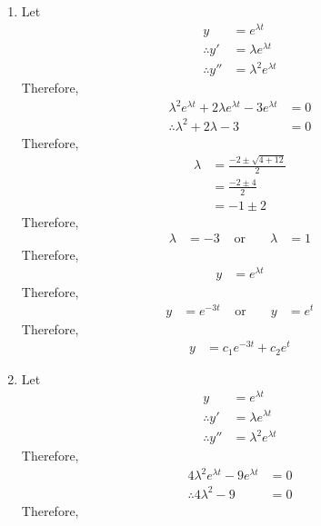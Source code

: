 \documentclass[fleqn, a4paper, 11pt, oneside]{amsart}
\theoremstyle{definition}
\theoremstyle{theorem}
\begin{document}
\begin{solution}
	\begin{enumerate}[leftmargin = *]
		\item
			Let
			\begin{align*}
				y              & = e^{\lambda t}         \\
				\therefore y'  & = \lambda e^{\lambda t} \\
				\therefore y'' & = \lambda^2 e^{\lambda t}
			\end{align*}
			Therefore,
			\begin{align*}
				\lambda^2 e^{\lambda t} + 2 \lambda e^{\lambda t} - 3 e^{\lambda t} & = 0 \\
				\therefore \lambda^2 + 2 \lambda - 3                                & = 0
			\end{align*}
			Therefore,
			\begin{align*}
				\lambda & = \frac{-2 \pm \sqrt{4 + 12}}{2} \\
                                        & = \frac{-2 \pm 4}{2}             \\
                                        & = -1 \pm 2
			\end{align*}
			Therefore,
			\begin{align*}
				\lambda & = -3 & \text{ or } &  & \lambda & = 1
			\end{align*}
			Therefore,
			\begin{align*}
				y & = e^{\lambda t}
			\end{align*}
			Therefore,
			\begin{align*}
				y & = e^{-3 t} & \text{ or } &  & y & = e^{t}
			\end{align*}
			Therefore,
			\begin{align*}
				y &= c_1 e^{-3 t} + c_2 e^{t}
			\end{align*}
		\item
			Let
			\begin{align*}
				y              & = e^{\lambda t}         \\
				\therefore y'  & = \lambda e^{\lambda t} \\
				\therefore y'' & = \lambda^2 e^{\lambda t}
			\end{align*}
			Therefore,
			\begin{align*}
				4 \lambda^2 e^{\lambda t} - 9 e^{\lambda t} & = 0 \\
				\therefore 4 \lambda^2 - 9                  & = 0
			\end{align*}
			Therefore,
			\begin{align*}

\end{align*}
\end{enumerate}
\end{solution}
\end{document}
